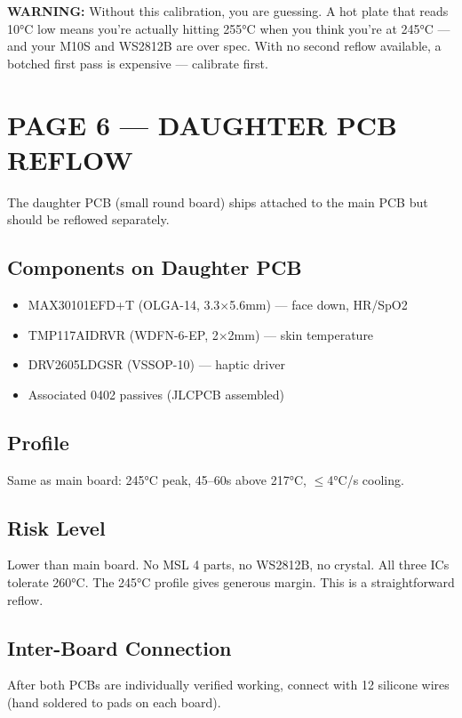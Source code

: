 \documentclass[11pt,a4paper]{article}
\newcommand{\dangerbox}[1]{\par\noindent\colorbox{danger!10}{\parbox{\dimexpr\textwidth-2\fboxsep}{%
\textcolor{danger}{\textbf{WARNING:}} #1}}\par\vspace{0.5em}}
\begin{document}
\dangerbox{Without this calibration, you are guessing. A hot plate that reads 10°C low means you're actually hitting 255°C when you think you're at 245°C — and your M10S and WS2812B are over spec. With no second reflow available, a botched first pass is expensive — calibrate first.}

\newpage
\section*{PAGE 6 — DAUGHTER PCB REFLOW}

The daughter PCB (small round board) ships attached to the main PCB but should be reflowed separately.

\subsection*{Components on Daughter PCB}
\begin{itemize}[nosep]
\item MAX30101EFD+T (OLGA-14, 3.3$\times$5.6mm) — face down, HR/SpO2
\item TMP117AIDRVR (WDFN-6-EP, 2$\times$2mm) — skin temperature
\item DRV2605LDGSR (VSSOP-10) — haptic driver
\item Associated 0402 passives (JLCPCB assembled)
\end{itemize}

\subsection*{Profile}
Same as main board: 245°C peak, 45--60s above 217°C, $\leq$4°C/s cooling.

\subsection*{Risk Level}
Lower than main board. No MSL 4 parts, no WS2812B, no crystal. All three ICs tolerate 260°C. The 245°C profile gives generous margin. This is a straightforward reflow.

\subsection*{Inter-Board Connection}
After both PCBs are individually verified working, connect with 12 silicone wires (hand soldered to pads on each board).
\end{document}
